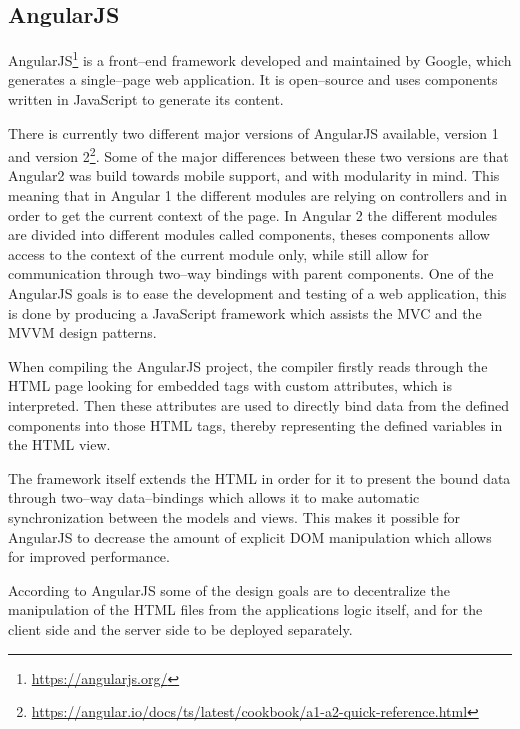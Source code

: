 \subsection{AngularJS} \label{ssec:angular}
AngularJS\footnote{\url{https://angularjs.org/}} is a front--end framework developed and maintained by Google, which generates a single--page web application.
It is open--source and uses components written in JavaScript to generate its content.

\bigskip
There is currently two different major versions of AngularJS available, version 1 and version 2\footnote{\url{https://angular.io/docs/ts/latest/cookbook/a1-a2-quick-reference.html}}.
Some of the major differences between these two versions are that Angular2 was build towards mobile support, and with modularity in mind.
This meaning that in Angular 1 the different modules are relying on controllers and  in order to get the current context of the page.
In Angular 2 the different modules are divided into different modules called components, theses components allow access to the context of the current module only, while still allow for communication through two--way bindings with parent components.
One of the AngularJS goals is to ease the development and testing of a web application, this is done by producing a JavaScript framework which assists the MVC and the MVVM design patterns.

\bigskip
When compiling the AngularJS project, the compiler firstly reads through the HTML page looking for embedded tags with custom attributes, which is interpreted.
Then these attributes are used to directly bind data from the defined components into those HTML tags, thereby representing the defined variables in the HTML view.

The framework itself extends the HTML in order for it to present the bound data through two--way data--bindings which allows it to make automatic synchronization between the models and views.
This makes it possible for AngularJS to decrease the amount of explicit \ac{DOM} manipulation which allows for improved performance.

According to AngularJS some of the design goals are to decentralize the manipulation of the HTML files from the applications logic itself, and for the client side and the server side to be deployed separately.
